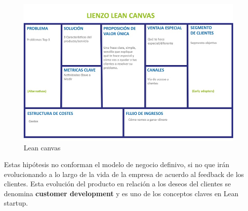 \begin{figure}
\begin{center}
\includegraphics[scale=0.6]{imagenes/leanCanvas.jpg}
\caption{Lean canvas}
\label{leanCanvas}
\end{center}
\end{figure}

Estas hipótesis no conforman el modelo de negocio definivo, si no que irán evolucionando a lo largo de la vida de la empresa de acuerdo al feedback de los clientes. Esta evolución del producto en relación a los deseos del clientes se denomina \textbf{customer development} y es uno de los conceptos claves en Lean startup.

